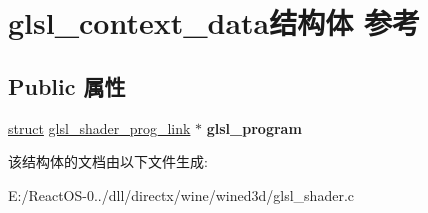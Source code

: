 \hypertarget{structglsl__context__data}{}\section{glsl\+\_\+context\+\_\+data结构体 参考}
\label{structglsl__context__data}
\subsection*{Public 属性}
\begin{DoxyCompactItemize}
\item 
\mbox{\label{structglsl__context__data_a260b2e9197fa8e8fde481eeb5135058f}} 
\hyperlink{interfacestruct}{struct} \hyperlink{structglsl__shader__prog__link}{glsl\+\_\+shader\+\_\+prog\+\_\+link} $\ast$ {\bfseries glsl\+\_\+program}
\end{DoxyCompactItemize}


该结构体的文档由以下文件生成\+:\begin{DoxyCompactItemize}
\item 
E\+:/\+React\+O\+S-\/0../dll/directx/wine/wined3d/glsl\+\_\+shader.\+c\end{DoxyCompactItemize}
